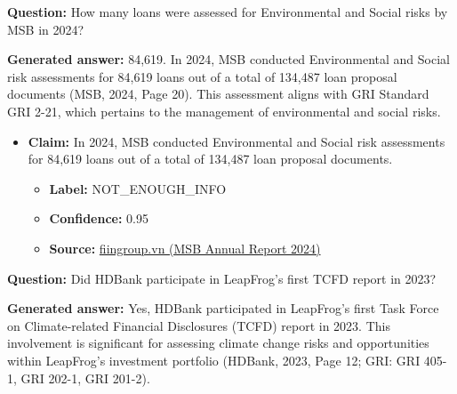 \documentclass[sn-mathphys, oneside]{sn-jnl}
\begin{document}
{\begin{tcolorbox}[colback=white,colframe=black!65,boxrule=0.6pt,arc=0pt,left=8pt,right=8pt,top=8pt,bottom=8pt]
\end{tcolorbox}


\begin{tcolorbox}[colback=white,colframe=black!65,boxrule=0.6pt,arc=0pt,left=8pt,right=8pt,top=8pt,bottom=8pt]

\textbf{Question:} How many loans were assessed for Environmental and Social risks by MSB in 2024?

\textbf{Generated answer:} 84,619. In 2024, MSB conducted Environmental and Social risk assessments for 84,619 loans out of a total of 134,487 loan proposal documents (MSB, 2024, Page 20). This assessment aligns with GRI Standard GRI 2-21, which pertains to the management of environmental and social risks.

\begin{itemize}
    \item \textbf{Claim:} In 2024, MSB conducted Environmental and Social risk assessments for 84,619 loans out of a total of 134,487 loan proposal documents.
    \begin{itemize}
        \item \textbf{Label:} NOT\_ENOUGH\_INFO
        \item \textbf{Confidence:} 0.95
        \item \textbf{Source:} \href{https://cmsv5.fiingroup.vn/medialib/FG/2025/2025-04/2025-04-22/20250422_MSB-250422-Annual-Report-2024.pdf}{fiingroup.vn (MSB Annual Report 2024)}
    \end{itemize}
\end{itemize}

\end{tcolorbox}


\begin{tcolorbox}[colback=white,colframe=black!65,boxrule=0.6pt,arc=0pt,left=8pt,right=8pt,top=8pt,bottom=8pt]

\textbf{Question:} Did HDBank participate in LeapFrog's first TCFD report in 2023?

\textbf{Generated answer:} Yes, HDBank participated in LeapFrog's first Task Force on Climate-related Financial Disclosures (TCFD) report in 2023. This involvement is significant for assessing climate change risks and opportunities within LeapFrog's investment portfolio (HDBank, 2023, Page 12; GRI: GRI 405-1, GRI 202-1, GRI 201-2).


\end{tcolorbox}}
\end{document}
